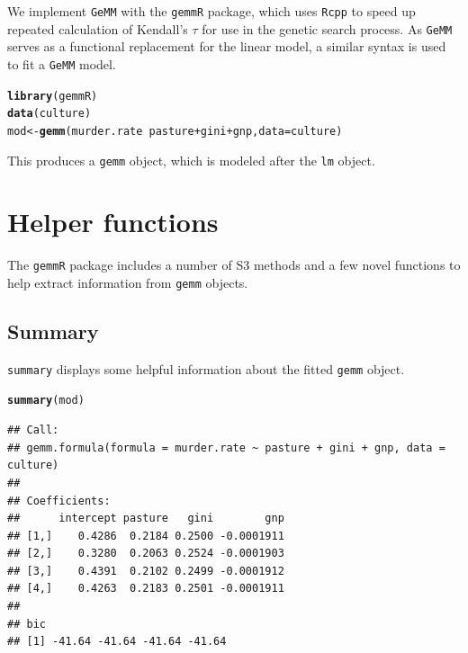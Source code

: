 \documentclass{article}\usepackage[]{graphicx}\usepackage[]{color}
\makeatletter
\newcommand{\hlopt}[1]{\textcolor[rgb]{0,0,0}{#1}}%
\newcommand{\hlstd}[1]{\textcolor[rgb]{0.345,0.345,0.345}{#1}}%
\newcommand{\hlkwb}[1]{\textcolor[rgb]{0.69,0.353,0.396}{#1}}%
\newcommand{\hlkwc}[1]{\textcolor[rgb]{0.333,0.667,0.333}{#1}}%
\newcommand{\hlkwd}[1]{\textcolor[rgb]{0.737,0.353,0.396}{\textbf{#1}}}%
\newenvironment{kframe}{%
 \def\at@end@of@kframe{}%
 \ifinner\ifhmode%
  \def\at@end@of@kframe{\end{minipage}}%
  \begin{minipage}{\columnwidth}%
 \fi\fi%
 \def\FrameCommand##1{\hskip\@totalleftmargin \hskip-\fboxsep
 \colorbox{shadecolor}{##1}\hskip-\fboxsep
     \hskip-\linewidth \hskip-\@totalleftmargin \hskip\columnwidth}%
 \MakeFramed {\advance\hsize-\width
   \@totalleftmargin\z@ \linewidth\hsize
   \@setminipage}}%
 {\par\unskip\endMakeFramed%
 \at@end@of@kframe}
\newenvironment{knitrout}{}{} %
\makeatother
\begin{document}
We implement \texttt{GeMM} with the \texttt{gemmR} package, which uses \texttt{Rcpp} to speed up repeated calculation of Kendall's $\tau$ for use in the genetic search process.
As \texttt{GeMM} serves as a functional replacement for the linear model, a similar syntax is used to fit a \texttt{GeMM} model.

\begin{knitrout}
\color{fgcolor}\begin{kframe}
\begin{alltt}
\hlkwd{library}\hlstd{(gemmR)}
\hlkwd{data}\hlstd{(culture)}
\hlstd{mod} \hlkwb{<-} \hlkwd{gemm}\hlstd{(murder.rate} \hlopt{~} \hlstd{pasture} \hlopt{+} \hlstd{gini} \hlopt{+} \hlstd{gnp,} \hlkwc{data} \hlstd{= culture)}
\end{alltt}
\end{kframe}
\end{knitrout}

This produces a \texttt{gemm} object, which is modeled after the \texttt{lm} object.

\section*{Helper functions}

The \texttt{gemmR} package includes a number of S3 methods and a few novel functions to help extract information from \texttt{gemm} objects.

\subsection*{Summary}

\texttt{summary} displays some helpful information about the fitted \texttt{gemm} object.

\begin{knitrout}
\color{fgcolor}\begin{kframe}
\begin{alltt}
\hlkwd{summary}\hlstd{(mod)}
\end{alltt}
\begin{verbatim}
## Call:
## gemm.formula(formula = murder.rate ~ pasture + gini + gnp, data = culture)
## 
## Coefficients:
##      intercept pasture   gini        gnp
## [1,]    0.4286  0.2184 0.2500 -0.0001911
## [2,]    0.3280  0.2063 0.2524 -0.0001903
## [3,]    0.4391  0.2102 0.2499 -0.0001912
## [4,]    0.4263  0.2183 0.2501 -0.0001911
## 
## bic
## [1] -41.64 -41.64 -41.64 -41.64
\end{verbatim}
\end{kframe}
\end{knitrout}
\end{document}

